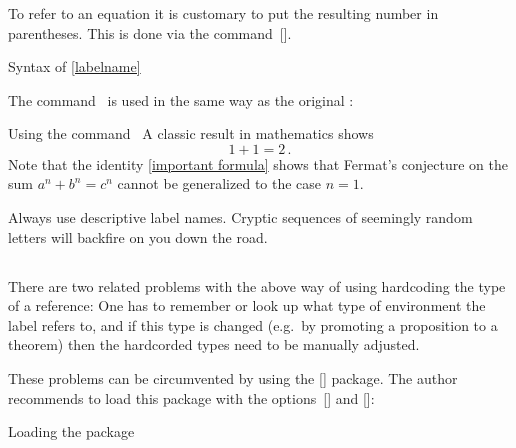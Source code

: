 \subsubsection{}

To refer to an equation it is customary to put the resulting number in parentheses.
This is done via the command~[\comname].
\begin{showcode}{Syntax of }
\eqref{labelname}
\end{showcode}
The command~ is used in the same way as the original :
\begin{showlatex}{Using the command~}
A classic result in mathematics shows
\begin{equation}
  \label{important formula}
  1 + 1 = 2 \,.
\end{equation}
Note that the identity \eqref{important formula} shows that Fermat’s conjecture on the sum $a^n + b^n = c^n$ cannot be generalized to the case $n = 1$.
\end{showlatex}

Always use descriptive label names.
Cryptic sequences of seemingly random letters will backfire on you down the road.



\subsection{}

There are two related problems with the above way of using hardcoding the type of a reference:
One has to remember or look up what type of environment the label  refers to, and if this type is changed (e.g.\ by promoting a proposition to a theorem) then the hardcorded types need to be manually adjusted.

These problems can be circumvented by using the [\packname] package.
The author recommends to load this package with the options~[\optname] and [\optname]:
\begin{showcode}[label={cref example}]{Loading the package~}
\usepackage[capitalise, noabbrev]{cleveref}
\end{showcode}

